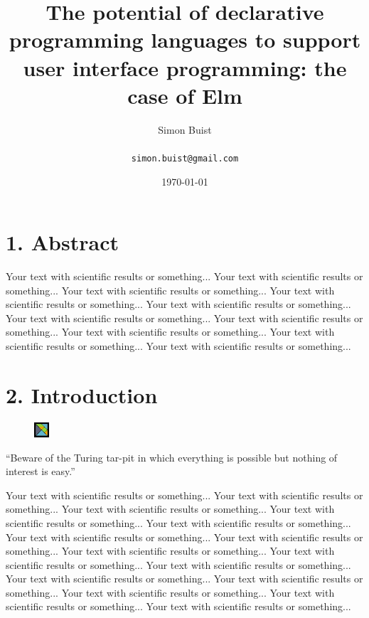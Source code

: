 \documentclass[final]{beamer}
\title
[none] %
{ %
The potential of declarative programming languages to support user interface
programming: the case of Elm
}
\author{ %
	Simon Buist\\
	\vspace{10mm}\ \\
	\texttt{simon.buist@gmail.com}
}
\institute
{The University of Bath} %
\date{\today}
\begin{document}
\begin{frame}[t]
\begin{multicols}{3}

\section{1. Abstract}

Your text with scientific results or something... 
Your text with scientific results or something... 
Your text with scientific results or something... 
Your text with scientific results or something... 
Your text with scientific results or something...
Your text with scientific results or something...
Your text with scientific results or something...
Your text with scientific results or something... 
Your text with scientific results or something... 
Your text with scientific results or something... 

\section{2. Introduction}

\begin{figure}
  \vspace{-20pt}
    \begin{center}
      \includegraphics[width=0.05\textwidth]{elmLogo.pdf}
    \end{center}
   \vspace{-20pt}
\end{figure}
``Beware of the Turing tar-pit in which everything is possible but nothing of
interest is easy.'' \cite{PerlisTuringTarpit}

Your text with scientific results or something... 
Your text with scientific results or something... 
Your text with scientific results or something... 
Your text with scientific results or something... 
Your text with scientific results or something... 
Your text with scientific results or something... 
Your text with scientific results or something... 
Your text with scientific results or something... 
Your text with scientific results or something... 
Your text with scientific results or something... 
Your text with scientific results or something... 
Your text with scientific results or something... 
Your text with scientific results or something... 
Your text with scientific results or something...
Your text with scientific results or something...



\end{multicols}
\end{frame}
\end{document}
